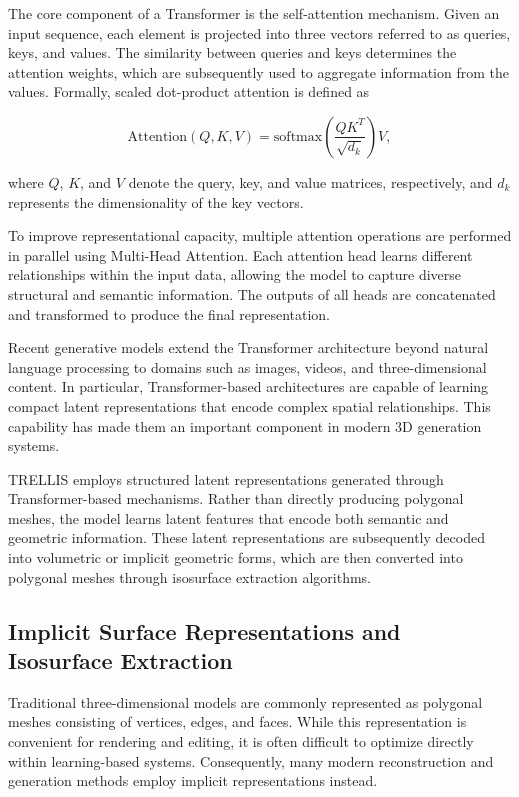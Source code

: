 \documentclass[../main.tex]{subfiles}
\begin{document}
The core component of a Transformer is the self-attention mechanism. Given an input sequence, each element is projected into three vectors referred to as queries, keys, and values. The similarity between queries and keys determines the attention weights, which are subsequently used to aggregate information from the values. Formally, scaled dot-product attention is defined as

\[
\mathrm{Attention}(Q,K,V)
=
\mathrm{softmax}
\left(
\frac{QK^{T}}{\sqrt{d_k}}
\right)V,
\]

where $Q$, $K$, and $V$ denote the query, key, and value matrices, respectively, and $d_k$ represents the dimensionality of the key vectors.

To improve representational capacity, multiple attention operations are performed in parallel using Multi-Head Attention. Each attention head learns different relationships within the input data, allowing the model to capture diverse structural and semantic information. The outputs of all heads are concatenated and transformed to produce the final representation.

Recent generative models extend the Transformer architecture beyond natural language processing to domains such as images, videos, and three-dimensional content. In particular, Transformer-based architectures are capable of learning compact latent representations that encode complex spatial relationships. This capability has made them an important component in modern 3D generation systems.

TRELLIS employs structured latent representations generated through Transformer-based mechanisms. Rather than directly producing polygonal meshes, the model learns latent features that encode both semantic and geometric information. These latent representations are subsequently decoded into volumetric or implicit geometric forms, which are then converted into polygonal meshes through isosurface extraction algorithms.

\subsection{Implicit Surface Representations and Isosurface Extraction}

Traditional three-dimensional models are commonly represented as polygonal meshes consisting of vertices, edges, and faces. While this representation is convenient for rendering and editing, it is often difficult to optimize directly within learning-based systems. Consequently, many modern reconstruction and generation methods employ implicit representations instead.
\end{document}
